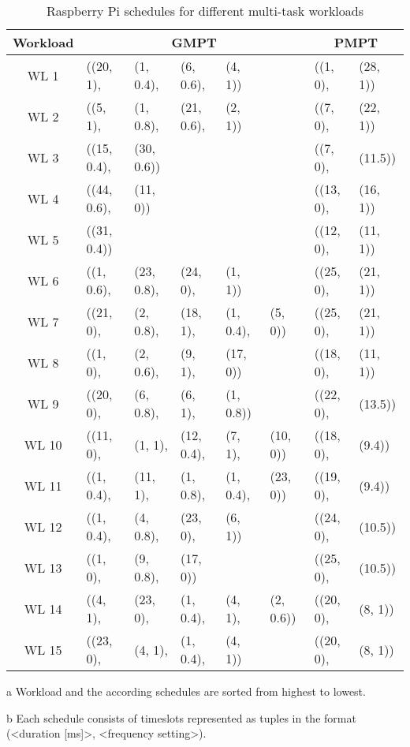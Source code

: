 \begin{table}[htpb]
 \centering
 \begin{threeparttable}
 \setlength\tabcolsep{3pt}
 \caption[Single-Task Pi schedules]{Raspberry Pi schedules for different multi-task workloads}\label{app:t_mmpt_pi}
 \begin{tabular}{||c||l l l l l|l l||} 
 \hline
 Workload\tnote{a} & \multicolumn{5}{c|}{GMPT\tnote{b}} & \multicolumn{2}{c||}{PMPT\tnote{b}} \\ [0.5ex]  
 \hline\hline
WL 1 & ((20, 1), & (1, 0.4), & (6, 0.6), & (4, 1)) & & ((1, 0), & (28, 1))\\
\hline
WL 2 & ((5, 1), & (1, 0.8), & (21, 0.6), & (2, 1)) & & ((7, 0), & (22, 1))\\
\hline
WL 3 & ((15, 0.4), & (30, 0.6)) & & & & ((7, 0), & (11.5))\\
\hline
WL 4 & ((44, 0.6), & (11, 0)) & & & & ((13, 0), & (16, 1))\\
\hline
WL 5 & ((31, 0.4)) & & & & & ((12, 0), & (11, 1))\\
\hline
WL 6 & ((1, 0.6), & (23, 0.8), & (24, 0), & (1, 1)) & & ((25, 0), & (21, 1))\\
\hline
WL 7 & ((21, 0), & (2, 0.8), & (18, 1), & (1, 0.4), & (5, 0)) & ((25, 0), & (21, 1))\\
\hline
WL 8 & ((1, 0), & (2, 0.6), & (9, 1), & (17, 0)) & & ((18, 0), & (11, 1))\\
\hline
WL 9 & ((20, 0), & (6, 0.8), & (6, 1), & (1, 0.8)) & & ((22, 0), & (13.5))\\
\hline
WL 10 & ((11, 0), & (1, 1), & (12, 0.4), & (7, 1), & (10, 0)) & ((18, 0), & (9.4))\\
\hline
WL 11 & ((1, 0.4), & (11, 1), & (1, 0.8), & (1, 0.4), & (23, 0)) & ((19, 0), & (9.4))\\
\hline
WL 12 & ((1, 0.4), & (4, 0.8), & (23, 0), & (6, 1)) & & ((24, 0), & (10.5))\\
\hline
WL 13 & ((1, 0), & (9, 0.8), & (17, 0)) & & & ((25, 0), & (10.5))\\
\hline
WL 14 & ((4, 1), & (23, 0), & (1, 0.4), & (4, 1), & (2, 0.6)) & ((20, 0), & (8, 1))\\
\hline
WL 15 & ((23, 0), & (4, 1), & (1, 0.4), & (4, 1)) & & ((20, 0), & (8, 1))\\
\hline
\end{tabular}
\begin{tablenotes}
\item [a] Workload and the according schedules are sorted from highest to lowest.
\item [b] Each schedule consists of timeslots represented as tuples in the format\\(<duration [ms]>, <frequency setting>).
\end{tablenotes}
\end{threeparttable}
\end{table}